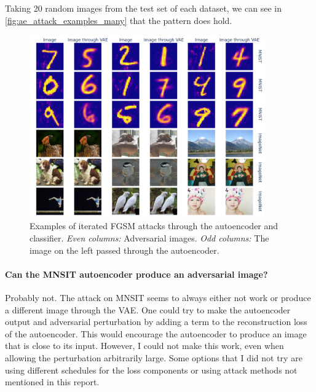 \documentclass[]{scrarticle}
\renewcommand{\todo}[1]{}
\begin{document}
Taking 20 random images from the test set of each dataset,
we can see in \autoref{fig:ae_attack_examples_many} that the pattern
does hold.

\begin{figure}[h]
  \centering
  \includegraphics[width=0.9\textwidth]{../images/ae_many_attack_examples.png}
  \caption{
    Examples of iterated FGSM attacks through the autoencoder and classifier.
    \emph{Even columns:} Adversarial images.
    \emph{Odd columns:} The image on the left passed through the autoencoder.
  }
  \label{fig:ae_attack_examples_many}
\end{figure}

\paragraph{Can the MNSIT autoencoder produce an adversarial image?}
Probably not.
The attack on MNSIT seems to always either not work or produce
a different image through the VAE. One could try to make the autoencoder
output and adversarial perturbation by adding a term to the reconstruction
loss of the autoencoder. This would encourage the autoencoder to produce
an image that is close to its input.
However, I could not make this work, even when allowing the perturbation
arbitrarily large. Some options that I did not try are using different schedules for
the loss components or using attack methods not mentioned in this report.
\end{document}

